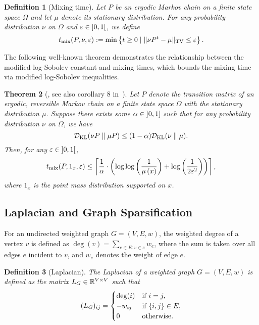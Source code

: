 \documentclass[11pt]{article}
\newtheorem{theorem}{Theorem} \newtheorem{lemma}[theorem]{Lemma} \newtheorem{proposition}[theorem]{Proposition} \newtheorem{corollary}[theorem]{Corollary} \newtheorem{definition}[theorem]{Definition} \newtheorem{conjecture}[theorem]{Conjecture} \newtheorem{claim}[theorem]{Claim} \newtheorem{fact}[theorem]{Fact}
\newcommand{\norms}[1]{\lVert #1 \rVert}
\newcommand{\ceil}[1]{\left\lceil #1 \right\rceil}
\newcommand{\paren}[1]{\left( #1 \right)}
\newcommand{\parens}[1]{( #1 )}
\newcommand{\set}[1]{\left\{ #1 \right\}}
\newcommand{\sets}[1]{\{ #1 \}}
\begin{document}
{\begin{definition}[Mixing time]
  Let $P$ be an ergodic Markov chain on a finite state space $\Omega$ and let
  $\mu$ denote its stationary distribution.
  For any probability distribution $\nu$ on $\Omega$ and
  $\varepsilon\in \interval[open]{0}{1}$, we define
  \begin{equation*}
    t_{\mix}\parens{P,\nu,\varepsilon}:=\min\set{t \geq 0 \mid \norms{\nu P^t -\mu}_{\TV}\leq \varepsilon}.
  \end{equation*}
\end{definition}
The following well-known theorem demonstrates the relationship between the modified log-Sobolev constant and mixing times, which bounds the mixing time via modified log-Sobolev inequalities.
\begin{theorem}[\cite{bobkov2006modified}, see also corollary 8 in~\cite{CGM21}]\label{thm:MLSI-mixing}
  Let $P$ denote the transition matrix of an ergodic, reversible Markov chain on
  a finite state space $\Omega$ with the stationary distribution $\mu$.
  Suppose there exists some $\alpha\in \interval[open left]{0}{1}$ such that for
  any probability distribution $\nu$ on $\Omega$, we have
  \begin{equation*}
    \cD_{\KL}\parens{\nu P \parallel \mu P}\leq \parens{1-\alpha}\cD_{\KL}\parens{\nu\parallel \mu}.
  \end{equation*}
 Then, for any $\varepsilon\in \interval[open]{0}{1}$,
 \begin{equation*}
   t_{\mix}\parens{P,1_x,\varepsilon}\leq \ceil{\frac{1}{\alpha}\cdot\paren{\log\log\paren{\frac{1}{\mu \paren{x}}}+\log\paren{\frac{1}{2\varepsilon^2} }}},
 \end{equation*}
   where $1_x$ is the point mass distribution supported on $x$.
\end{theorem}


\subsection{Laplacian and Graph Sparsification}
For an undirected weighted graph  $G = (V, E, w)$, the weighted degree of a vertex  $v$  is defined as
$\deg(v) = \sum_{e \in E: v \in e} w_e$,
where the sum is taken over all edges  $e$  incident to  $v$, and $ w_e$  denotes the weight of edge  $e$.

\begin{definition}[Laplacian]
	The Laplacian of a weighted graph $G=\parens{V,E,w}$ is defined as the matrix $L_{G}\in \mathbb{R}^{V\times V}$ such that
	\begin{equation*}
		\parens{L_ G}_{ij}=
		\begin{cases}
			\deg\parens {i} & \textup{if }i=j,             \\
			-w _ {ij}       & \textup{if }\sets{i,j}\in E, \\
			0               & \textup{otherwise}.
		\end{cases}
	\end{equation*}
\end{definition}

}
\end{document}

